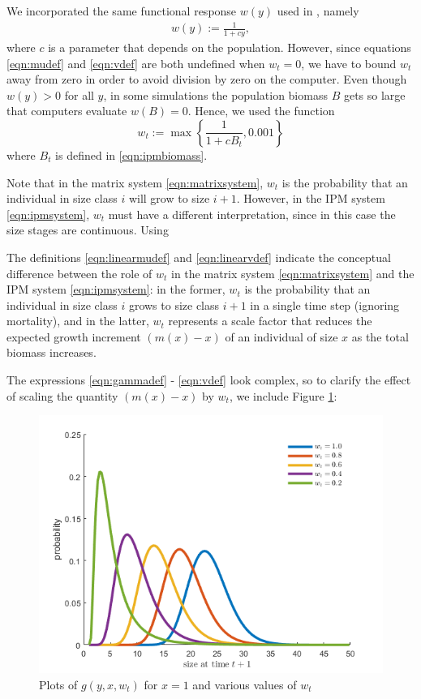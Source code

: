 We incorporated the same functional response $w(y)$ used in \cite{Callahan2019}, namely 
\begin{align}
	w(y) := \frac{1}{1 + c y}, \label{eqn:wdef}
\end{align}
where $c$ is a parameter that depends on the population. However, since equations \eqref{eqn:mudef} and \eqref{eqn:vdef} are both undefined when $w_t = 0$, we have to bound $w_t$ away from zero in order to avoid division by zero on the computer. Even though $w(y)>0$ for all $y$, in some simulations the population biomass $B$ gets so large that computers evaluate $w(B)=0$. Hence, we used the function
\[w_t := \max \left\{\frac{1}{1 + c B_t}, 0.001 \right\}\]
where $B_t$ is defined in \ref{eqn:ipmbiomass}. 

Note that in the matrix system \eqref{eqn:matrixsystem}, $w_t$ is the probability that an individual in size class $i$ will grow to size $i+1$. However, in the IPM system \eqref{eqn:ipmsystem}, $w_t$ must have a different interpretation, since in this case the size stages are continuous. Using 

The definitions \eqref{eqn:linearmudef} and \eqref{eqn:linearvdef} indicate the conceptual difference between the role of $w_t$ in the matrix system \eqref{eqn:matrixsystem} and the IPM system \eqref{eqn:ipmsystem}: in the former, $w_t$ is the probability that an individual in size class $i$ grows to size class $i + 1$ in a single time step (ignoring mortality), and in the latter, $w_t$ represents a scale factor that reduces the expected growth increment $(m(x) - x)$ of an individual of size $x$ as the total biomass increases.

The expressions \eqref{eqn:gammadef} - \eqref{eqn:vdef} look complex, so to clarify the effect of scaling the quantity $(m(x) - x)$ by $w_t$, we include Figure \ref{fig:nonlinear_comparison}:

\begin{figure}[H]
	\centering
	\includegraphics[width=0.7\linewidth]{Images/nonlinear_comparison}
	\caption{Plots of $g(y, x, w_t)$ for $x = 1$ and various values of $w_t$}
	\label{fig:nonlinear_comparison}
\end{figure}


